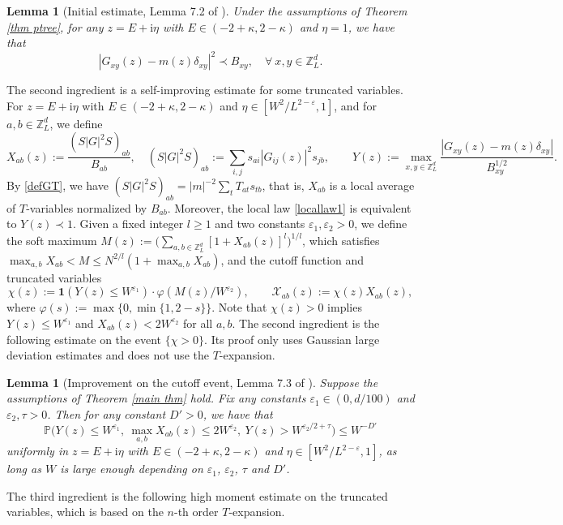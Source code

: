 \documentclass{article}
\newcommand{\1}{\mathds{1}}
\numberwithin{equation}{section}
\newcommand{\be}{\begin{equation}}
\newcommand{\ee}{\end{equation}}
\newcommand{\e}{{\varepsilon}}
\renewcommand{\cal}{\mathcal}
\newcommand{\ii}{\mathrm{i}} %
\renewcommand{\leq}{\leqslant}
\renewcommand{\geq}{\geqslant}
\renewcommand{\le}{\leq}
\renewcommand{\ge}{\geq}
\renewcommand{\P}{\mathbb{P}}
\newcommand{\Z}{\mathbb{Z}}
\theoremstyle{plain} %
\newtheorem{lemma}[theorem]{Lemma}
\theoremstyle{remark}
\newcommand{\cor}{\color{red}}
\newcommand{\cob}{\color{purple}}
\newcommand{\hty}[1]{{\cor (ht: #1) }}
\begin{document}

\begin{lemma}[Initial estimate, Lemma 7.2 of \cite{PartII_high}] \label{eta1case0} %
Under the assumptions of Theorem \ref{thm ptree}, for any $z=E+\ii\eta$ with $E\in (-2+\kappa,2-\kappa)$ and $\eta=1$, we have that 
\be\label{locallaw eta1}
|G_{xy} (z) -m(z)\delta_{xy}|^2\prec  B_{xy}  ,\quad \forall \ x,y \in \Z_L^d.  
\ee
\end{lemma}


The second ingredient is a self-improving estimate for some truncated variables. For $z=E+\ii\eta$ with $E\in (-2+\kappa,2-\kappa)$ and $\eta\in [W^{2}/L^{2-\e},1]$, and for $a,b\in \Z_L^d$, we define
\be\label{def XY}
X_{ab}(z):=\frac{(S|G|^2S)_{ab}}{B_{ab}},\quad (S|G|^2S)_{ab}:=\sum_{i,j}s_{ai}|G_{ij}(z)|^2 s_{jb},\qquad Y(z):=\max_{x,y\in \Z_L^d}\frac{|G_{xy}(z)-m(z)\delta_{xy}|}{B_{xy}^{1/2}} .
\ee
By \eqref{defGT}, we have $(S|G|^2S)_{ab}=|m|^{-2}\sum_{t}T_{at}s_{tb}$, that is, $X_{ab}$ is a local average of $T$-variables normalized by $B_{ab}$. Moreover, the local law \eqref{locallaw1} is equivalent to $Y(z)\prec 1$. Given a fixed integer $l\ge 1$ and two constants $\e_1,\e_2>0$, we define the soft maximum $M(z):=\big(\sum_{a,b\in \Z_L^d}\left[1+X_{ab}(z)\right]^l\big)^{1/l}$, which satisfies $\max_{a,b}X_{ab}<M\le N^{2/l}(1+\max_{a,b}X_{ab})$, and the cutoff function and truncated variables
\be\label{def cutoff}
\chi(z):=\mathbf 1\left(Y(z)\le W^{\e_1}\right)\cdot \varphi\left(M(z)/W^{\e_2}\right),\qquad \cal X_{ab}(z):=\chi(z) X_{ab}(z),
\ee
where $\varphi(s):=\max\{0,\min\{1,2-s\}\}$. Note that $\chi(z)>0$ implies $Y(z)\le W^{\e_1}$ and $X_{ab}(z)<2W^{\e_2}$ for all $a,b$. The second ingredient is the following estimate on the event $\{\chi>0\}$. Its proof only uses Gaussian large deviation estimates and does not use the $T$-expansion.

 \begin{lemma}[Improvement on the cutoff event, Lemma 7.3 of \cite{PartII_high}]\label{lem: ini bound}
Suppose the assumptions of Theorem \ref{main thm} hold. Fix any constants $\e_1\in (0,d/100)$ and $\e_2,\tau>0$. Then for any constant $D'>0$, we have that
\be\label{cut improve}
\P\Big(Y(z)\le W^{\e_1},\ \max_{a,b}X_{ab}(z)\le 2W^{\e_2},\ Y(z)> W^{\e_2/2+\tau}\Big)\le W^{-D'}
\ee
uniformly in $z=E+\ii\eta$ with $E\in (-2+\kappa,2-\kappa)$ and $\eta\in [W^{2}/L^{2-\e},1]$, as long as $W$ is large enough depending on $\e_1$, $\e_2$, $\tau$ and $D'$.
 \end{lemma}
The third ingredient is the following high moment estimate on the truncated variables, which is based on the $n$-th order $T$-expansion.
\end{document}
